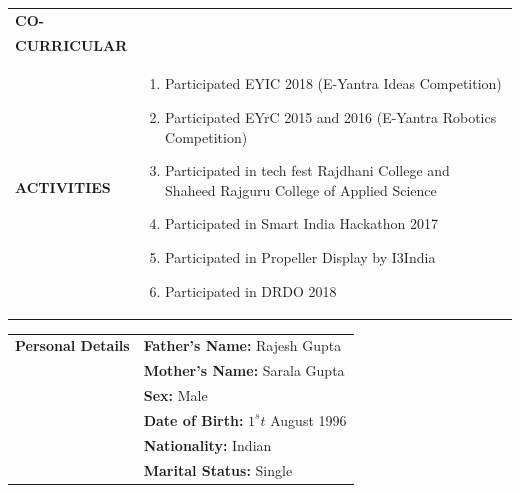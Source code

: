 \documentclass{article}
\begin{document}
\begin{table}[h]
    \begin{tabular}{l  p{}} 
      \textbf{\Large{CO-}} \\  \textbf{\Large{CURRICULAR}}\\ \textbf{\Large{ACTIVITIES}}&
	\begin{enumerate}
	\item Participated EYIC 2018 (E-Yantra Ideas Competition)
	\item Participated EYrC 2015 and 2016 (E-Yantra Robotics Competition)
	\item Participated in tech fest Rajdhani College and Shaheed Rajguru College of Applied Science
	\item Participated in Smart India Hackathon 2017
	\item Participated in Propeller Display by I3India
	\item Participated in DRDO 2018
   	\end{enumerate} 
    \end{tabular}
\end{table}

\begin{table}[h!]
    \begin{tabular}{l  l} 
      \textbf{\Large{Personal Details}} &
	\textbf{Father's Name: } Rajesh Gupta \\
	&\textbf{Mother's Name: } Sarala Gupta\\
	&\textbf{Sex: } Male\\
	&\textbf{Date of Birth: } $1^st$ August 1996\\
	&\textbf{Nationality: } Indian\\
	&\textbf{Marital Status: } Single\\
   	 
    \end{tabular}
\end{table}
\end{document}
